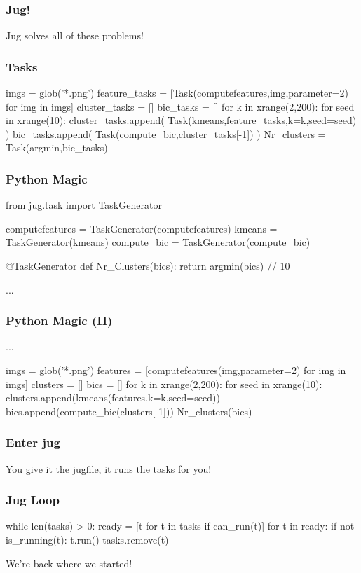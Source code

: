 \documentclass{beamer}
\begin{document}
\begin{frame}[fragile]
\frametitle{Jug!}
Jug solves all of these problems!
\end{frame}

\begin{frame}[fragile]
\frametitle{Tasks}
\begin{python}
imgs = glob('*.png')
feature_tasks = [Task(computefeatures,img,parameter=2)
                    for img in imgs]
cluster_tasks = []
bic_tasks = []
for k in xrange(2,200):
    for seed in xrange(10):
        cluster_tasks.append(
            Task(kmeans,feature_tasks,k=k,seed=seed)
            )
        bic_tasks.append(
            Task(compute_bic,cluster_tasks[-1])
            )
Nr_clusters = Task(argmin,bic_tasks)
\end{python}
\end{frame}

\begin{frame}[fragile]
\frametitle{Python Magic}

\begin{python}
from jug.task import TaskGenerator

computefeatures = TaskGenerator(computefeatures)
kmeans = TaskGenerator(kmeans)
compute_bic = TaskGenerator(compute_bic)

@TaskGenerator
def Nr_Clusters(bics):
    return argmin(bics) // 10

...
\end{python}
\end{frame}

\begin{frame}[fragile]
\frametitle{Python Magic (II)}

\begin{python}
...

imgs = glob('*.png')
features = [computefeatures(img,parameter=2)
            for img in imgs]
clusters = []
bics = []
for k in xrange(2,200):
    for seed in xrange(10):
        clusters.append(kmeans(features,k=k,seed=seed))
        bics.append(compute_bic(clusters[-1]))
Nr_clusters(bics)
\end{python}

\end{frame}

\begin{frame}[fragile]
\frametitle{Enter jug}

You give it the jugfile, it runs the tasks for you!

\end{frame}
\begin{frame}[fragile]
\frametitle{Jug Loop}

\begin{python}
while len(tasks) > 0:
    ready = [t for t in tasks if can_run(t)]
    for t in ready:
        if not is_running(t):
            t.run()
        tasks.remove(t)
\end{python}

We're back where we started!

\end{frame}
\end{document}
